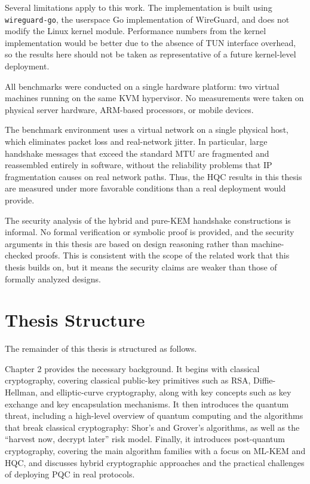 Several limitations apply to this work. The implementation is built using \texttt{wireguard-go}, the userspace Go implementation of WireGuard, and does not modify the Linux kernel module. Performance numbers from the kernel implementation would be better due to the absence of TUN interface overhead, so the results here should not be taken as representative of a future kernel-level deployment. 

All benchmarks were conducted on a single hardware platform: two virtual machines running on the same KVM hypervisor. No measurements were taken on physical server hardware, ARM-based processors, or mobile devices.

The benchmark environment uses a virtual network on a single physical host, which eliminates packet loss and real-network jitter. In particular, large handshake messages that exceed the standard MTU are fragmented and reassembled entirely in software, without the reliability problems that IP fragmentation causes on real network paths. Thus, the HQC results in this thesis are measured under more favorable conditions than a real deployment would provide. 

The security analysis of the hybrid and pure-KEM handshake constructions is informal. No formal verification or symbolic proof is provided, and the security arguments in this thesis are based on design reasoning rather than machine-checked proofs. This is consistent with the scope of the related work that this thesis builds on, but it means the security claims are weaker than those of formally analyzed designs.


\section{Thesis Structure} 
The remainder of this thesis is structured as follows.

Chapter 2 provides the necessary background. It begins with classical cryptography, covering classical public-key primitives such as RSA, Diffie-Hellman, and elliptic-curve cryptography, along with key concepts such as key exchange and key encapsulation mechanisms. It then introduces the quantum threat, including a high-level overview of quantum computing and the algorithms that break classical cryptography: Shor's and Grover's algorithms, as well as the ``harvest now, decrypt later'' risk model. Finally, it introduces post-quantum cryptography, covering the main algorithm families with a focus on ML-KEM and HQC, and discusses hybrid cryptographic approaches and the practical challenges of deploying PQC in real protocols. 

